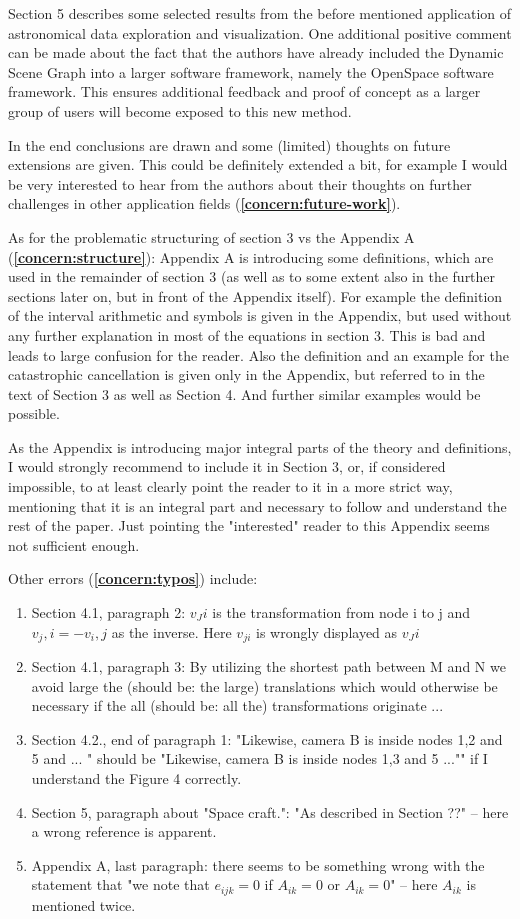 \documentclass{article}
\let\oldref\ref
\renewcommand{\ref}[1]{{\color{blue}(\textbf{\oldref{#1}})}}
\begin{document}
Section 5 describes some selected results from the before mentioned application of astronomical data exploration and visualization.
One additional positive comment can be made about the fact that the authors
have already included the Dynamic Scene Graph into a larger software framework, namely the OpenSpace software framework.
This ensures additional feedback and proof of concept as a larger group of users will become exposed to this new method.

In the end conclusions are drawn and some (limited) thoughts on future extensions are given.
This could be definitely extended a bit, for example I would be very interested to hear from the authors about their thoughts on further challenges in other application fields \ref{concern:future-work}.

As for the problematic structuring of section 3 vs the Appendix A \ref{concern:structure}: 
Appendix A is introducing some definitions, which are used in the remainder of section 3 (as well as to some extent also in the further sections later on, but in front of the Appendix itself). 
For example the definition of the interval arithmetic and symbols is given in the Appendix, but used without any further explanation in most of the equations in section 3.
This is bad and leads to large confusion for the reader.
Also the definition and an example for the catastrophic cancellation is given only in the Appendix, but referred to in the text of Section 3 as well as Section 4.
And further similar examples would be possible.

As the Appendix is introducing major integral parts of the theory and definitions, I would strongly recommend to include it in Section 3, or, if considered impossible, to at least clearly point the reader to it in a more strict way, mentioning that it is an integral part and necessary to follow and understand the rest of the paper.
Just pointing the "interested" reader to this Appendix seems not sufficient enough.

Other errors \ref{concern:typos} include:

\begin{enumerate}
\item Section 4.1, paragraph 2: $v_Ji$ is the transformation from node i to j and $v_j,i=-v_i,j$ as the inverse.
Here $v_{ji}$ is wrongly displayed as $v_Ji$
\item Section 4.1, paragraph 3: By utilizing the shortest path between M and N we avoid large the (should be: the large) translations which would otherwise be necessary if the all (should be: all the) transformations originate ...
\item Section 4.2., end of paragraph 1: "Likewise, camera B is inside nodes 1,2 and 5 and ...
" should be "Likewise, camera B is inside nodes 1,3 and 5 ..."" if I understand the Figure 4 correctly.
\item Section 5, paragraph about "Space craft.": "As described in Section ??" -- here a wrong reference is apparent.
\item Appendix A, last paragraph: there seems to be something wrong with the statement that "we note that $e_{ijk}=0$ if $A_{ik}=0$ or $A_{ik}=0$" -- here $A_{ik}$ is mentioned twice.
\end{enumerate}
\end{document}
